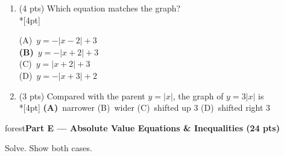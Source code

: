 \documentclass[12pt]{article}
\newcommand{\lgrid}[4]{%
  \draw[step=1, linegray!40, very thin] (#1,#3) grid (#2,#4);
  \draw[->, semithick, charcoal] (#1,0)--(#2,0) node[below right, font=\scriptsize]{$x$};
  \draw[->, semithick, charcoal] (0,#3)--(0,#4) node[left, font=\scriptsize]{$y$};}
\newcommand{\parthead}[1]{%
  \boxguard[10]\vspace{6pt}\noindent
  \begin{headlinebox}{forest}\color{white}\bfseries #1\end{headlinebox}%
  \vspace{4pt}}
\newcommand{\opt}[2]{(#1)~#2}
\newcommand{\optok}[2]{\mbox{\llap{\textcolor{keyred}{$\boldsymbol{\rightarrow}$}\,}\textcolor{keyred}{\textbf{(#1)}~#2}}}
\begin{document}
\begin{enumerate}[leftmargin=1.9em, itemsep=10pt, label=\arabic*., start=15]
  \item {}(4 pts) Which equation matches the graph?
    \\*[4pt]
    \begin{minipage}[c]{0.36\linewidth}\centering
    \end{minipage}%
    \begin{minipage}[c]{0.6\linewidth}
    \opt{A}{$y=-|x-2|+3$} \\[6pt]
    \optok{B}{$y=-|x+2|+3$} \\[6pt]
    \opt{C}{$y=|x+2|+3$} \\[6pt]
    \opt{D}{$y=-|x+3|+2$}
    \end{minipage}

  \item {}(3 pts) Compared with the parent $y=|x|$, the graph of $y=3|x|$ is
    \\*[4pt]
    \optok{A}{narrower} \hfill \opt{B}{wider} \hfill \opt{C}{shifted up 3} \hfill
    \opt{D}{shifted right 3}
\end{enumerate}

\parthead{Part E --- Absolute Value Equations \& Inequalities (24 pts)}
Solve. Show both cases.
\end{document}
